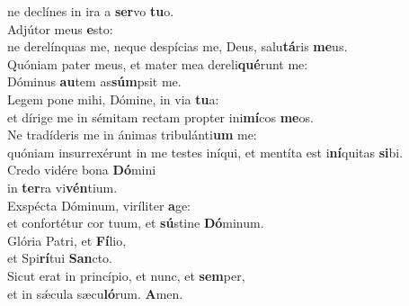\evenverse ne declínes in ira a \textbf{ser}vo \textbf{tu}o.\\
\oddverse Adjútor meus \textbf{e}sto:~\*\\
\oddverse ne derelínquas me, neque despícias me, Deus, salu\textbf{tá}ris \textbf{me}us.\\
\evenverse Quóniam pater meus, et mater mea dereli\textbf{qué}runt me:~\*\\
\evenverse Dóminus \textbf{au}tem as\textbf{súm}psit me.\\
\oddverse Legem pone mihi, Dómine, in via \textbf{tu}a:~\*\\
\oddverse et dírige me in sémitam rectam propter ini\textbf{mí}cos \textbf{me}os.\\
\evenverse Ne tradíderis me in ánimas tribulánti\textbf{um} me:~\*\\
\evenverse quóniam insurrexérunt in me testes iníqui, et mentíta est i\textbf{ní}quitas \textbf{si}bi.\\
\oddverse Credo vidére bona \textbf{Dó}mini~\*\\
\oddverse in \textbf{ter}ra vi\textbf{vén}tium.\\
\evenverse Exspécta Dóminum, viríliter \textbf{a}ge:~\*\\
\evenverse et confortétur cor tuum, et \textbf{sú}stine \textbf{Dó}minum.\\
\oddverse Glória Patri, et \textbf{Fí}lio,~\*\\
\oddverse et Spi\textbf{rí}tui \textbf{San}cto.\\
\evenverse Sicut erat in princípio, et nunc, et \textbf{sem}per,~\*\\
\evenverse et in sǽcula sæcu\textbf{ló}rum. \textbf{A}men.\\
